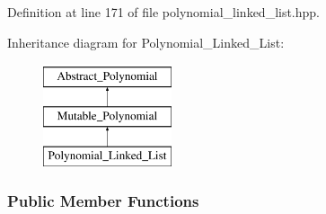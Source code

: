 Definition at line 171 of file polynomial\+\_\+linked\+\_\+list.\+hpp.

Inheritance diagram for Polynomial\+\_\+\+Linked\+\_\+\+List\+:\begin{figure}[H]
\begin{center}
\leavevmode
\includegraphics[height=3.000000cm]{group__polygroup}
\end{center}
\end{figure}
\subsubsection*{Public Member Functions}
